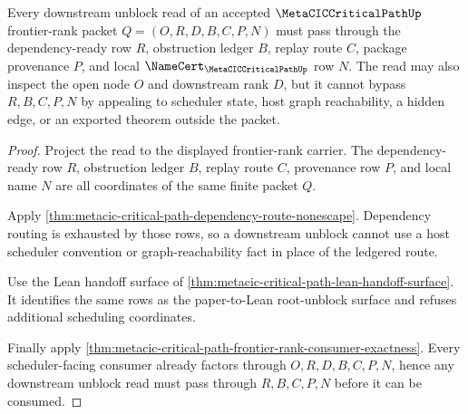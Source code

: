 \begin{theorem}
\label{thm:metacic-critical-path-downstream-unblock-surface}
Every downstream unblock read of an accepted $\MetaCICCriticalPathUp$ frontier-rank packet $Q=(O,R,D,B,C,P,N)$ must pass through the dependency-ready row $R$, obstruction ledger $B$, replay route $C$, package provenance $P$, and local $\NameCert_{\MetaCICCriticalPathUp}$ row $N$. The read may also inspect the open node $O$ and downstream rank $D$, but it cannot bypass $R,B,C,P,N$ by appealing to scheduler state, host graph reachability, a hidden edge, or an exported theorem outside the packet.
\end{theorem}
\begin{proof}
Project the read to the displayed frontier-rank carrier. The dependency-ready row $R$, obstruction ledger $B$, replay route $C$, provenance row $P$, and local name $N$ are all coordinates of the same finite packet $Q$.

Apply \autoref{thm:metacic-critical-path-dependency-route-nonescape}. Dependency routing is exhausted by those rows, so a downstream unblock cannot use a host scheduler convention or graph-reachability fact in place of the ledgered route.

Use the Lean handoff surface of \autoref{thm:metacic-critical-path-lean-handoff-surface}. It identifies the same rows as the paper-to-Lean root-unblock surface and refuses additional scheduling coordinates.

Finally apply \autoref{thm:metacic-critical-path-frontier-rank-consumer-exactness}. Every scheduler-facing consumer already factors through $O,R,D,B,C,P,N$, hence any downstream unblock read must pass through $R,B,C,P,N$ before it can be consumed.
\end{proof}


